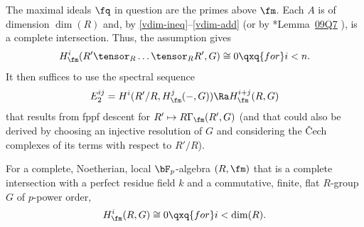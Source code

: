 \bpf
The maximal ideals $\fq$ in question are the primes above $\fm$. Each $A$ is of dimension $\dim(R)$ and, by \eqref{vdim-ineq}--\eqref{vdim-add} (or by \cite{SP}*{Lemma~\href{https://stacks.math.columbia.edu/tag/09Q7}{09Q7}%
}), is a complete intersection. Thus, the assumption gives
\[
H^i_\fm(R' \tensor_R \dotsc \tensor_R R', G) \cong 0 \qxq{for} i < n.
\]
It then suffices to use the spectral sequence
\[
E_2^{ij} = H^i(R'/R, H^j_\fm(-, G)) \Ra H^{i + j}_\fm(R, G)
\]
that results from fppf descent for $R'\mapsto R\Gamma_\fm(R',G)$ (and that could also be derived by choosing an injective resolution of $G$ and considering the \v{C}ech complexes of its terms with respect to $R'/R$).
\epf





\bprop \label{thm:main-pos-char}
For a complete, Noetherian, local $\bF_p$-algebra $(R, \fm)$ that is a complete intersection with a perfect residue field $k$ and a commutative, finite, flat $R$-group $G$ of $p$-power order,
\[
H^i_\fm(R, G) \cong 0 \qxq{for} i < \dim(R).
\]
\eprop


